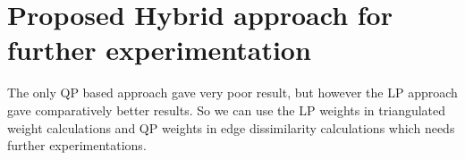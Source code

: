 \section*{Proposed Hybrid approach for further experimentation}
The only QP based approach gave very poor result, but however the LP approach gave comparatively better results. So we can use the LP weights in triangulated weight calculations and QP weights in edge dissimilarity calculations which needs further experimentations.
   
